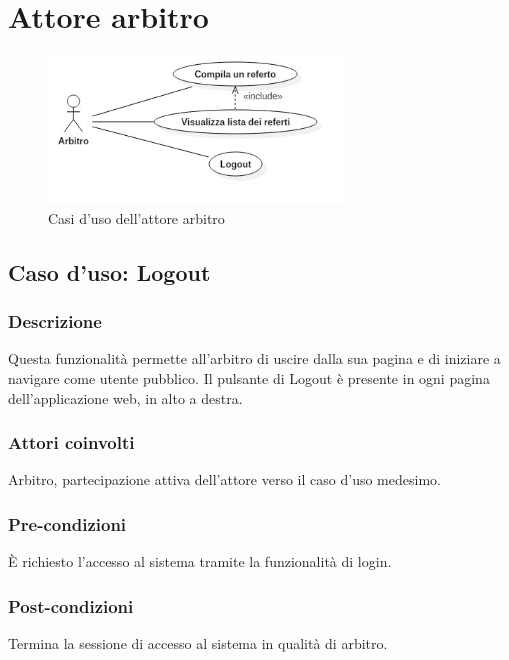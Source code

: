 
\clearpage

\section{Attore arbitro}
%
%
\begin{figure}[h]
	\centering
	\includegraphics[width=0.7\textwidth]
	{immagini/uc-arbitro}
	
	\caption{Casi d'uso dell'attore arbitro}
\end{figure}


%
%
\subsection{Caso d'uso: Logout}

\subsubsection*{Descrizione}
Questa funzionalità permette all'arbitro di uscire dalla sua pagina e di iniziare a navigare come utente pubblico.
Il pulsante di Logout è presente in ogni pagina dell'applicazione web, in alto a destra.

\subsubsection*{Attori coinvolti}
Arbitro, partecipazione attiva dell'attore verso il caso d'uso medesimo.

\subsubsection*{Pre-condizioni}
È richiesto l'accesso al sistema tramite la funzionalità di login.

\subsubsection*{Post-condizioni}
Termina la sessione di accesso al sistema in qualità di arbitro.

